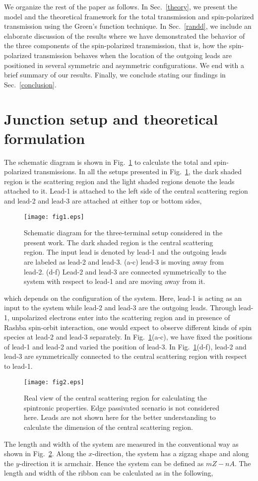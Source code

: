 \documentclass[prb,aps,twocolumn,amsmath,amssymb,floatfix,
superscriptaddress]{revtex4}
\begin{document}
We organize the rest of the paper as follows. In Sec.~\ref{theory}, we present
the model and the theoretical framework for the total transmission and
spin-polarized transmission using the Green's function technique.  In
Sec.~\ref{randd}, we include an elaborate discussion of the results where we
have demonstrated the behavior of the three components of the
spin-polarized transmission, that is, how the spin-polarized
transmission behaves when the location of the outgoing leads are
positioned in several symmetric and asymmetric configurations. We end
with a brief summary of our results. Finally, we conclude stating our
findings in Sec.~\ref{conclusion}.


\section{{\label{theory}}Junction setup and theoretical formulation}
The schematic diagram is shown in Fig.~\ref{setup} to calculate the
total and spin-polarized transmissions. In all the setups presented in
Fig.~\ref{setup}, the dark shaded region is the scattering region and
the light shaded regions denote the leads attached to it. Lead-1 is
attached to the left side of the central scattering region and lead-2
and lead-3 are attached at either top or bottom sides,
\begin{figure}[h]
\centering
\texttt{[image: fig1.eps]}
\caption{Schematic diagram for the three-terminal setup considered in
  the present work. The dark shaded region is the central scattering
  region. The input lead is denoted by lead-1 and the outgoing leads
  are labeled as lead-2 and lead-3. (a-c) lead-3 is moving away from
  lead-2. (d-f) Lead-2 and lead-3 are connected symmetrically to the
  system with respect to lead-1 and are moving away from it.}
\label{setup}
\end{figure}
which depends on the configuration of the system. Here, lead-1 is
acting as an input to the system while lead-2 and lead-3 are the
outgoing leads. Through lead-1, unpolarized electrons enter into the
scattering region and in presence of Rashba spin-orbit interaction,
one would expect to observe different kinds of spin species at lead-2
and lead-3 separately. In Fig.~\ref{setup}(a-c), we have fixed the
positions of lead-1 and lead-2 and varied the position of lead-3. In
Fig.~\ref{setup}(d-f), lead-2 and lead-3 are symmetrically connected
to the central scattering region with respect to lead-1.

\begin{figure}[h]
\centering
\texttt{[image: fig2.eps]}
\caption{Real view of the central scattering region for calculating
  the spintronic properties. Edge passivated scenario is not
    considered here. Leads are not shown here for the better
  understanding to calculate the dimension of the central scattering
  region.}
\label{dim}
\end{figure}
The length and width of the system are measured in the conventional
way as shown in Fig.~\ref{dim}. Along the $x$-direction, the system
has a zigzag shape and along the $y$-direction it is armchair. Hence
the system can be defined as $mZ-nA$. The length and width of the
ribbon can be calculated as in the following,
\end{document}
